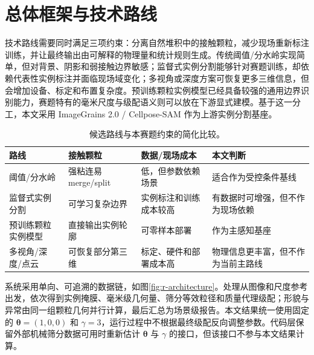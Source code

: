 \section{总体框架与技术路线}
\label{sec:r-framework}

技术路线需要同时满足三项约束：分离自然堆积中的接触颗粒，减少现场重新标注训练，并让最终输出由可解释的物理量和统计规则生成。传统阈值/分水岭实现简单，但对背景、阴影和弱接触边界敏感；监督式实例分割能够针对赛题训练，却依赖代表性实例标注并面临现场域变化；多视角或深度方案可恢复更多三维信息，但会增加设备、标定和布置复杂度。预训练颗粒实例模型已经具备较强的通用边界识别能力，赛题特有的毫米尺度与级配语义则可以放在下游显式建模。基于这一分工，本文采用 ImageGrains 2.0 / Cellpose-SAM 作为上游实例分割基座\cite{stringer2021cellpose,pachitariu2025cellposeSAM,mair2026imagegrains2}。

\begin{table}[t]
\centering
\caption{候选路线与本赛题约束的简化比较。}
\label{tab:r-route}
\footnotesize
\renewcommand{\arraystretch}{1.12}
\begin{tabular}{>{\raggedright\arraybackslash}p{3.1cm}>{\raggedright\arraybackslash}p{3.1cm}>{\raggedright\arraybackslash}p{3.0cm}>{\raggedright\arraybackslash}p{4.1cm}}
\toprule
路线 & 接触颗粒 & 数据/现场成本 & 本文判断 \\
\midrule
阈值/分水岭 & 强粘连易 merge/split & 低，但参数依赖场景 & 适合作为受控条件基线 \\
监督式实例分割 & 可学习复杂边界 & 实例标注和训练成本较高 & 有数据时可增强，但不作为现场依赖 \\
预训练颗粒实例模型 & 直接输出实例轮廓 & 可零样本部署 & 作为主感知基座 \\
多视角/深度/点云 & 可恢复部分第三维 & 标定、硬件和部署成本高 & 物理信息更丰富，但不作为当前主路线 \\
\bottomrule
\end{tabular}
\end{table}

系统采用单向、可追溯的数据链，如图\ref{fig:r-architecture}。处理从图像和尺度参考出发，依次得到实例掩膜、毫米级几何量、筛分等效粒径和质量代理级配；形貌与异常由同一组颗粒几何并行计算，最后汇总为场景级报告。本文结果统一使用固定的 $\boldsymbol{\theta}=(1,0,0)$ 和 $\gamma=3$，运行过程中不根据最终级配反向调整参数。代码层保留外部机械筛分数据可用时重新估计 $\boldsymbol{\theta}$ 与 $\gamma$ 的接口，但该接口不参与本文结果计算。

